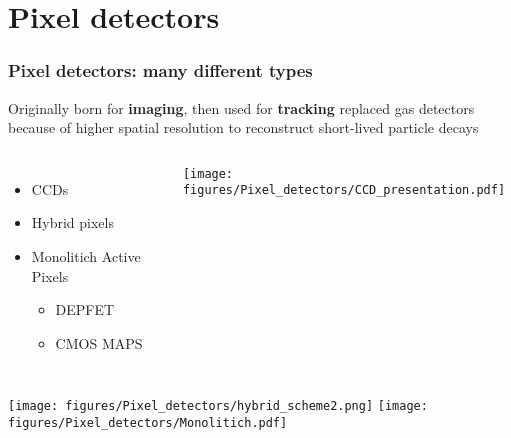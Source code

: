 \section{Pixel detectors}



    \begin{frame}
        \frametitle{Pixel detectors: many different types}
        Originally born for \textbf{imaging}, then used for \textbf{tracking} replaced gas detectors because of higher spatial resolution to reconstruct short-lived particle decays
        \begin{columns}
                \vspace*{-0.5cm}\begin{itemize}
                    \item CCDs 
                    \item Hybrid pixels 
                    \item Monolitich Active Pixels
                    \begin{itemize}
                        \item DEPFET %
                        \item CMOS MAPS
                    \end{itemize}
                \end{itemize}
            \medskip
            \pause
                \vspace*{+0.5cm}\centering\texttt{[image: figures/Pixel\_detectors/CCD\_presentation.pdf]} 
        \end{columns}
        
        \pause
        \vspace*{-0.8cm}\texttt{[image: figures/Pixel\_detectors/hybrid\_scheme2.png]}
        \pause
        \texttt{[image: figures/Pixel\_detectors/Monolitich.pdf]}
    \end{frame}


